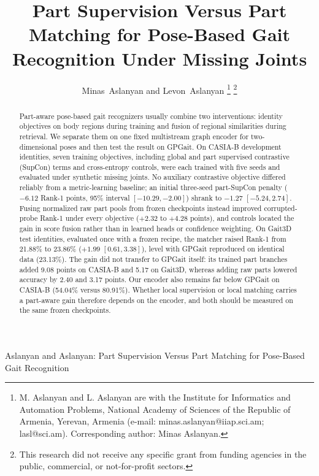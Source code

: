 \documentclass[journal]{IEEEtran}
\begin{document}
\title{Part Supervision Versus Part Matching for Pose-Based Gait Recognition Under Missing Joints}

\author{Minas~Aslanyan and Levon~Aslanyan%
\thanks{M. Aslanyan and L. Aslanyan are with the Institute for Informatics and
Automation Problems, National Academy of Sciences of the Republic of Armenia,
Yerevan, Armenia (e-mail: minas.aslanyan@iiap.sci.am; lasl@sci.am).
Corresponding author: Minas Aslanyan.}%
\thanks{This research did not receive any specific grant from funding agencies
in the public, commercial, or not-for-profit sectors.}}

%
{Aslanyan and Aslanyan: Part Supervision Versus Part Matching for Pose-Based Gait Recognition}

\maketitle

\begin{abstract}
Part-aware pose-based gait recognizers usually combine two interventions:
identity objectives on body regions during training and fusion of regional
similarities during retrieval. We separate them on one fixed multistream graph
encoder for two-dimensional poses and then test the result on GPGait. On
CASIA-B development identities, seven training objectives, including global
and part supervised contrastive (SupCon) terms and cross-entropy controls, were
each trained with five seeds and evaluated under synthetic missing joints. No
auxiliary contrastive objective differed reliably from a metric-learning
baseline; an initial three-seed part-SupCon penalty ($-6.12$ Rank-1 points,
95\% interval $[-10.29,-2.00]$) shrank to $-1.27$ $[-5.24,2.74]$. Fusing
normalized raw part pools from frozen checkpoints instead improved
corrupted-probe Rank-1 under every objective ($+2.32$ to $+4.28$ points), and
controls located the gain in score fusion rather than in learned heads or
confidence weighting. On Gait3D test identities, evaluated once with a frozen
recipe, the matcher raised Rank-1 from 21.88\% to 23.86\% ($+1.99$
$[0.61,3.38]$), level with GPGait reproduced on identical data (23.13\%). The
gain did not transfer to GPGait itself: its trained part branches added 9.08
points on CASIA-B and 5.17 on Gait3D, whereas adding raw parts lowered accuracy
by 2.40 and 3.17 points. Our encoder also remains far below GPGait on CASIA-B
(54.04\% versus 80.91\%). Whether local supervision or local matching carries a
part-aware gain therefore depends on the encoder, and both should be measured
on the same frozen checkpoints.
\end{abstract}
\end{document}
